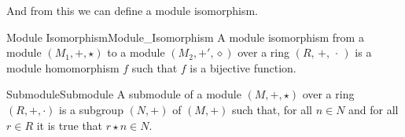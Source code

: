     And from this we can define a module isomorphism.
    \begin{fdefinition}{Module Isomorphism}{Module_Isomorphism}
        A \gls{module isomorphism} from a \gls{module}
        $(M_{1},\boldsymbol{+},\star)$ to a module
        $(M_{2},\boldsymbol{+}',\diamond)$ over a \gls{ring}
        $(R,\,+,\,\cdot\,)$ is a \gls{module homomorphism} $f$ such that $f$ is
        a \gls{bijective function}.
    \end{fdefinition}
    \begin{fdefinition}{Submodule}{Submodule}
        A \gls{submodule} of a \gls{module}
        $(M,\boldsymbol{+},\star)$ over a ring $(R,+,\cdot)$ is a \gls{subgroup}
        $(N,\boldsymbol{+})$ of $(M,\boldsymbol{+})$ such that, for all
        $n\in{N}$ and for all $r\in{R}$ it is true that $r\star{n}\in{N}$.
    \end{fdefinition}